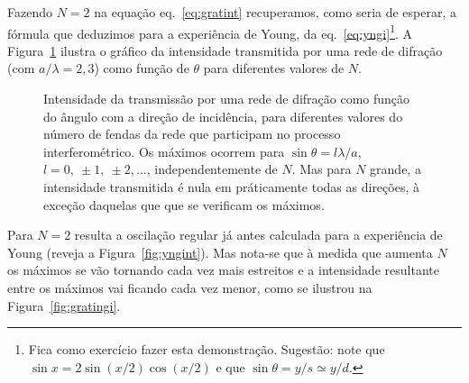 Fazendo $N=2$ na equação eq.~\eqref{eq:gratint} recuperamos, como seria de
esperar, a fórmula que deduzimos para a experiência de Young, da
eq.~\eqref{eq:yngi}\footnote{Fica como exercício fazer esta demonstração.
  Sugestão: note que $\sin x=2\sin(x/2)\cos(x/2)$ e que $\sin\theta=y/s\simeq
y/d$.}. A Figura~\ref{fig:gratint2} ilustra o gráfico da intensidade transmitida
por uma rede de difração (com $a/\lambda=2,3$) como função de $\theta$ para
diferentes valores de $N$.
\begin{figure}[htb]
  {\centering
    \par
  }
  \caption{\label{fig:gratint2}Intensidade da transmissão por uma rede de
    difração como função do ângulo com a direção de incidência, para diferentes
    valores do número de fendas da rede que participam no processo
    interferométrico. Os máximos ocorrem para $\sin\theta=l\lambda/a$, $l=0,\
    \pm1,\ \pm2, \ldots$, independentemente de $N$. Mas para $N$ grande, a
    intensidade transmitida é nula em práticamente todas as direções, à exceção
  daquelas que que se verificam os máximos.}
\end{figure}
Para $N=2$ resulta a oscilação regular já antes calculada para a experiência de
Young (reveja a Figura~\ref{fig:yngint}). Mas nota-se que à medida que aumenta
$N$ os máximos se vão tornando cada vez mais estreitos e a intensidade
resultante entre os máximos vai ficando cada vez menor, como se ilustrou na
Figura~\ref{fig:gratingi}.






